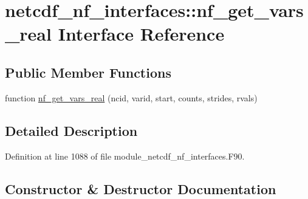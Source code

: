 \hypertarget{interfacenetcdf__nf__interfaces_1_1nf__get__vars__real}{}\section{netcdf\+\_\+nf\+\_\+interfaces\+:\+:nf\+\_\+get\+\_\+vars\+\_\+real Interface Reference}
\label{interfacenetcdf__nf__interfaces_1_1nf__get__vars__real}
\subsection*{Public Member Functions}
\begin{DoxyCompactItemize}
\item 
function \hyperlink{interfacenetcdf__nf__interfaces_1_1nf__get__vars__real_ab4740ed2c2c2aa527cf77410429823c8}{nf\+\_\+get\+\_\+vars\+\_\+real} (ncid, varid, start, counts, strides, rvals)
\end{DoxyCompactItemize}


\subsection{Detailed Description}


Definition at line 1088 of file module\+\_\+netcdf\+\_\+nf\+\_\+interfaces.\+F90.



\subsection{Constructor \& Destructor Documentation}
\mbox{\label{interfacenetcdf__nf__interfaces_1_1nf__get__vars__real_ab4740ed2c2c2aa527cf77410429823c8}} 

